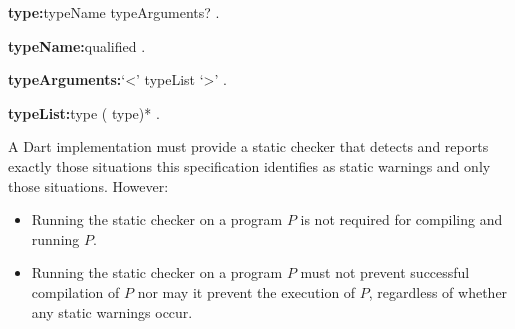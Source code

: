 \documentclass{article}
\begin{document}
\begin{grammar}
{\bf type:}typeName typeArguments?
  .

{\bf typeName:}qualified
  .

{\bf typeArguments:}`<' typeList `>'
  .

{\bf typeList:}type (\gcomma{} type)*
  .
\end{grammar}

\LMHash{}
A Dart implementation must provide a static checker that detects and reports exactly those situations this specification identifies as static warnings and only those situations.
However:
\begin{itemize}
\item Running the static checker on a program $P$ is not required for compiling and running $P$.
\item Running the static checker on a program $P$ must not prevent successful compilation of $P$ nor may it prevent the execution of $P$, regardless of whether any static warnings occur.
\end{itemize}

\end{document}
